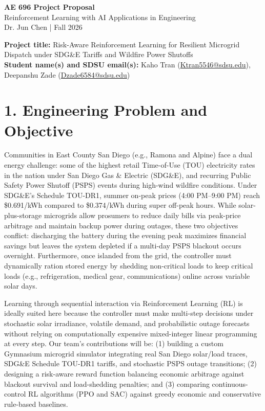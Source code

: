 \documentclass[11pt,letterpaper]{article}
\begin{document}
\begin{center}
{\large\bfseries\color{SDSUDarkRed} AE 696 Project Proposal}\\[3pt]
Reinforcement Learning with AI Applications in Engineering\\
Dr. Jun Chen \quad | \quad Fall 2026
\end{center}

\textbf{Project title:} Risk-Aware Reinforcement Learning for Resilient Microgrid Dispatch under SDG\&E Tariffs and Wildfire Power Shutoffs\\
\textbf{Student name(s) and SDSU email(s):} Kaho Tran (\href{mailto:Ktran5546@sdsu.edu}{Ktran5546@sdsu.edu}), Deepanshu Zade (\href{mailto:Dzade6584@sdsu.edu}{Dzade6584@sdsu.edu})

\section*{1. Engineering Problem and Objective}
Communities in East County San Diego (e.g., Ramona and Alpine) face a dual energy challenge: some of the highest retail Time-of-Use (TOU) electricity rates in the nation under San Diego Gas \& Electric (SDG\&E), and recurring Public Safety Power Shutoff (PSPS) events during high-wind wildfire conditions. Under SDG\&E's Schedule TOU-DR1, summer on-peak prices (4:00 PM--9:00 PM) reach \$0.691/kWh compared to \$0.374/kWh during super off-peak hours. While solar-plus-storage microgrids allow prosumers to reduce daily bills via peak-price arbitrage and maintain backup power during outages, these two objectives conflict: discharging the battery during the evening peak maximizes financial savings but leaves the system depleted if a multi-day PSPS blackout occurs overnight. Furthermore, once islanded from the grid, the controller must dynamically ration stored energy by shedding non-critical loads to keep critical loads (e.g., refrigeration, medical gear, communications) online across variable solar days.

Learning through sequential interaction via Reinforcement Learning (RL) is ideally suited here because the controller must make multi-step decisions under stochastic solar irradiance, volatile demand, and probabilistic outage forecasts without relying on computationally expensive mixed-integer linear programming at every step. Our team's contributions will be: (1) building a custom Gymnasium microgrid simulator integrating real San Diego solar/load traces, SDG\&E Schedule TOU-DR1 tariffs, and stochastic PSPS outage transitions; (2) designing a risk-aware reward function balancing economic arbitrage against blackout survival and load-shedding penalties; and (3) comparing continuous-control RL algorithms (PPO and SAC) against greedy economic and conservative rule-based baselines.
\end{document}
